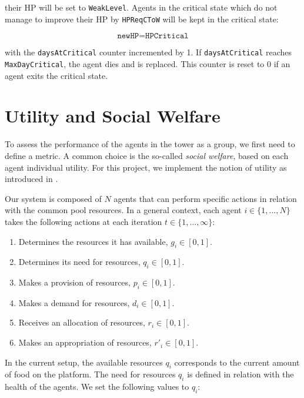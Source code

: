 their HP will be set to \texttt{WeakLevel}. Agents in the critical state which do not manage to improve their HP by \lstinline$HPReqCToW$ will be kept in the critical state:

\begin{equation}\label{hpDecay_critical_stay}
    \texttt{newHP} = \texttt{HPCritical}
\end{equation}

with the \texttt{daysAtCritical} counter incremented by 1. If \texttt{daysAtCritical} reaches \texttt{MaxDayCritical}, the agent dies and is replaced. This counter is reset to 0 if an agent exits the critical state.




\section{Utility and Social Welfare}\label{utility}

To assess the performance of the agents in the tower as a group, we first need to define a metric. A common choice is the so-called \emph{social welfare}, based on each agent individual utility. For this project, we implement the notion of utility as introduced in \cite{somasPitt}.

Our system is composed of $N$ agents that can perform specific actions in relation with the common pool resources. In a general context, each agent 
$i\in\{1, \ldots, N\}$ takes the following actions at each iteration $t\in\{1,\ldots,\infty\}$:

\begin{enumerate}
    \item Determines the resources it has available, $g_i \in [0,1]$.
    \item Determines its need for resources, $q_i \in [0,1]$.
    \item Makes a provision of resources, $p_i \in [0,1]$.
    \item Makes a demand for resources, $d_i \in [0,1]$.
    \item Receives an allocation of resources, $r_i \in [0,1]$.
    \item Makes an appropriation of resources, $r'_i \in [0,1]$.
\end{enumerate}

In the current setup, the available resources $q_i$ corresponds to the current amount of food on the platform.  The need for resources $q_i$ is defined in relation with the health of the agents. We set the following values to $q_i$:

